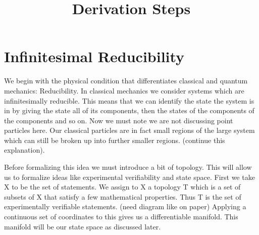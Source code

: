 \documentclass{article}
\begin{document}
\title{Derivation Steps}

\section{Infinitesimal Reducibility}

	We begin with the physical condition that differentiates classical and quantum mechanics: Reducibility. In classical mechanics we consider systems which are infinitesimally reducible. This means that we can identify the state the system is in by giving the state all of its components, then the states of the components of the components and so on. Now we must note we are not discussing point particles here. Our classical particles are in fact small regions of the large system which can still be broken up into further smaller regions. (continue this explanation). 
	
	Before formalizing this idea we must introduce a bit of topology. This will allow us to formalize ideas like experimental verifiability and state space. First we take X to be the set of statements. We assign to X a topology T which is a set of subsets of X that satisfy a few mathematical properties. Thus T is the set of experimentally verifiable statements. (need diagram like on paper) Applying a continuous set of coordinates to this gives us a differentiable manifold. This manifold will be our state space as discussed later.
\end{document}
